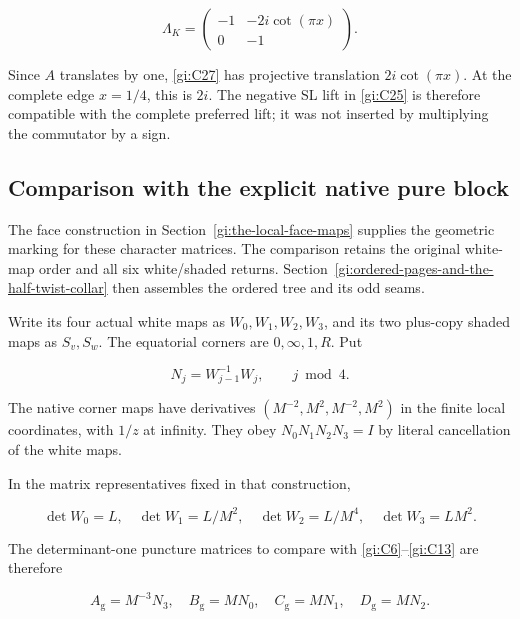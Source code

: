 \begin{equation}\label{gi:C27}
\Lambda_K=
 \begin{pmatrix}
 -1&-2i\cot(\pi x)\\0&-1
 \end{pmatrix}.
\end{equation}

Since \(A\) translates by one, \eqref{gi:C27} has projective translation
\(2i\cot(\pi x)\). At the complete edge \(x=1/4\), this is \(2i\).
The negative SL lift in \eqref{gi:C25} is therefore compatible with the complete preferred lift; it was not inserted by multiplying the commutator by a sign.

\subsection{Comparison with the explicit native pure block}\label{gi:comparison-with-the-explicit-native-pure-block}

The face construction in Section~\ref{gi:the-local-face-maps} supplies the geometric marking
for these character matrices. The comparison retains the original
white-map order and all six white/shaded returns. Section~\ref{gi:ordered-pages-and-the-half-twist-collar} then
assembles the ordered tree and its odd seams.

Write its four actual white maps as \(W_0,W_1,W_2,W_3\), and its two plus-copy shaded maps as \(S_v,S_w\). The equatorial corners are \(0,\infty,1,R\). Put

\begin{equation}\label{gi:C28}
N_j=W_{j-1}^{-1}W_j,\qquad j\bmod4.
\end{equation}

The native corner maps have derivatives
\((M^{-2},M^2,M^{-2},M^2)\) in the finite local coordinates, with \(1/z\) at infinity. They obey
\(N_0N_1N_2N_3=I\) by literal cancellation of the white maps.

In the matrix representatives fixed in that construction,

\begin{equation}\label{gi:C29}
\det W_0=L,\quad \det W_1=L/M^2,\quad
 \det W_2=L/M^4,\quad \det W_3=LM^2.
\end{equation}

The determinant-one puncture matrices to compare with \eqref{gi:C6}--\eqref{gi:C13} are therefore

\begin{equation}\label{gi:C30}
A_{\mathrm g}=M^{-3}N_3,\quad
 B_{\mathrm g}=MN_0,\quad
 C_{\mathrm g}=MN_1,\quad
 D_{\mathrm g}=MN_2.
\end{equation}

